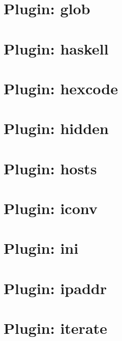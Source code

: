 \documentclass[twoside]{book}
\newcommand{\+}{\discretionary{\mbox{\scriptsize$\hookleftarrow$}}{}{}}
\begin{document}
\chapter{Plugin\+: glob}
\label{md_src_plugins_glob_README}

\chapter{Plugin\+: haskell}
\label{md_src_plugins_haskell_README}

\chapter{Plugin\+: hexcode}
\label{md_src_plugins_hexcode_README}

\chapter{Plugin\+: hidden}
\label{md_src_plugins_hidden_README}

\chapter{Plugin\+: hosts}
\label{md_src_plugins_hosts_README}

\chapter{Plugin\+: iconv}
\label{md_src_plugins_iconv_README}

\chapter{Plugin\+: ini}
\label{md_src_plugins_ini_README}

\chapter{Plugin\+: ipaddr}
\label{md_src_plugins_ipaddr_README}

\chapter{Plugin\+: iterate}
\label{md_src_plugins_iterate_README}

\end{document}
